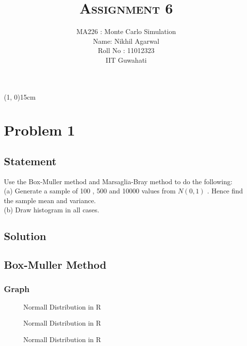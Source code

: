 \documentclass[10pt]{article}
\begin{document}
\title{\textbf{\textsc{Assignment 6}}}
\author{MA226 : Monte Carlo Simulation \\
			Name: Nikhil Agarwal \\
			Roll No : 11012323 \\
			IIT Guwahati}
\date{}
\maketitle

\begin{center}
	\line(1, 0){15cm}
\end{center}

\section{Problem 1}

\subsection{Statement}
Use the Box-Muller method and Marsaglia-Bray method to do the following:\\
(a) Generate a sample of 100 , 500 and 10000 values from $ N(0,1) $ . Hence find the sample mean and variance.\\  
(b) Draw histogram in all cases.\\
\subsection{Solution}
\subsection{Box-Muller Method}
\enlargethispage*{1000pt}
\subsubsection{Graph}
\begin{figure}[H]
		\centering
		\resizebox{0.6\linewidth}{!}{\texttt{[image: q1\_100]}}
		\caption{Normall Distribution in R}
		\label{fig:q1_f1_a}
\end{figure}
\pagebreak
\begin{figure}[H]
		\centering
		\resizebox{0.6\linewidth}{!}{\texttt{[image: q1\_500]}}
		\caption{Normall Distribution in R}
		\label{fig:q1_f1_a}
\end{figure}
\begin{figure}[H]
		\centering
		\resizebox{0.6\linewidth}{!}{\texttt{[image: q1\_10000]}}
		\caption{Normall Distribution in R}
		\label{fig:q1_f1_a}
\end{figure}
\pagebreak
\end{document}
